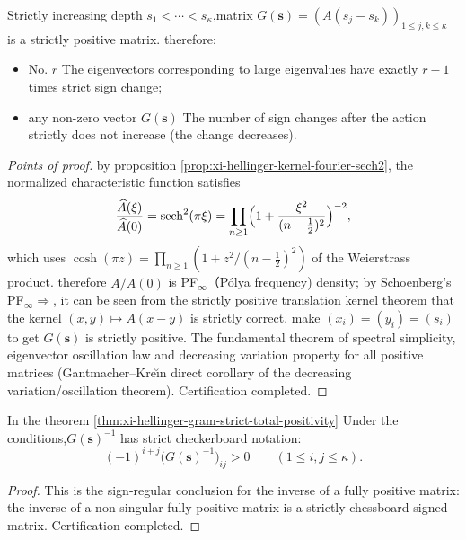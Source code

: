 \begin{theorem}\label{thm:xi-hellinger-gram-strict-total-positivity}
Strictly increasing depth \(s_1<\cdots<s_\kappa\),matrix \(G(\mathbf s)=(A(s_j-s_k))_{1\le j,k\le\kappa}\) is a strictly positive matrix.
therefore:
\begin{itemize}
\All eigenvalues ​​of item are single roots;
\item No. \(r\) The eigenvectors corresponding to large eigenvalues ​​have exactly \(r-1\) times strict sign change;
\item any non-zero vector \(G(\mathbf s)\) The number of sign changes after the action strictly does not increase (the change decreases).
\end{itemize}
\end{theorem}
\begin{proof}[Points of proof]
by proposition \ref{prop:xi-hellinger-kernel-fourier-sech2}, the normalized characteristic function satisfies
\[
\frac{\widehat A(\xi)}{\widehat A(0)}=\mathrm{sech}^{2}(\pi\xi)
=\prod_{n\ge 1}\Bigl(1+\frac{\xi^{2}}{(n-\tfrac12)^{2}}\Bigr)^{-2},
\]
which uses \(\cosh(\pi z)=\prod_{n\ge 1}(1+z^{2}/(n-\tfrac12)^{2})\) of the Weierstrass product.
therefore \(A/\widehat A(0)\) is PF\(_\infty\)（P\'olya frequency) density; by Schoenberg's PF\(_\infty\)\(\Rightarrow\), it can be seen from the strictly positive translation kernel theorem that the kernel \((x,y)\mapsto A(x-y)\) is strictly correct.
make \((x_i)=(y_i)=(s_i)\) to get \(G(\mathbf s)\) is strictly positive.
The fundamental theorem of spectral simplicity, eigenvector oscillation law and decreasing variation property for all positive matrices (Gantmacher--Kre\u{\i}n direct corollary of the decreasing variation/oscillation theorem). Certification completed.
\end{proof}

\begin{corollary}\label{cor:xi-hellinger-gram-inverse-checkerboard}
In the theorem \ref{thm:xi-hellinger-gram-strict-total-positivity} Under the conditions,\(G(\mathbf s)^{-1}\) has strict checkerboard notation:
\[
\boxed{\;
(-1)^{i+j}\bigl(G(\mathbf s)^{-1}\bigr)_{ij}>0\qquad(1\le i,j\le \kappa).\;}
\]
\end{corollary}
\begin{proof}
This is the sign-regular conclusion for the inverse of a fully positive matrix: the inverse of a non-singular fully positive matrix is ​​a strictly chessboard signed matrix. Certification completed.
\end{proof}

